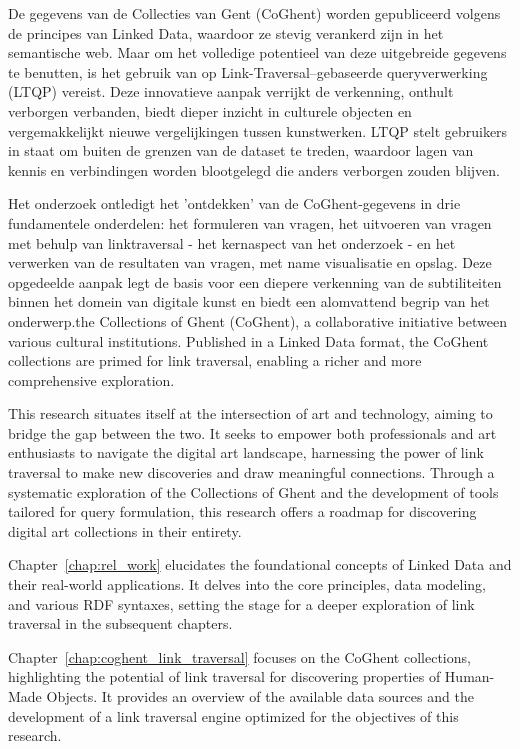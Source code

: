 De gegevens van de Collecties van Gent (CoGhent) worden gepubliceerd volgens de principes van Linked Data, waardoor ze stevig verankerd zijn in het semantische web. Maar om het volledige potentieel van deze uitgebreide gegevens te benutten, is het gebruik van op Link-Traversal–gebaseerde queryverwerking (LTQP) vereist. Deze innovatieve aanpak verrijkt de verkenning, onthult verborgen verbanden, biedt dieper inzicht in culturele objecten en vergemakkelijkt nieuwe vergelijkingen tussen kunstwerken. LTQP stelt gebruikers in staat om buiten de grenzen van de dataset te treden, waardoor lagen van kennis en verbindingen worden blootgelegd die anders verborgen zouden blijven.

Het onderzoek ontledigt het 'ontdekken' van de CoGhent-gegevens in drie fundamentele onderdelen: het formuleren van vragen, het uitvoeren van vragen met behulp van linktraversal - het kernaspect van het onderzoek - en het verwerken van de resultaten van vragen, met name visualisatie en opslag. Deze opgedeelde aanpak legt de basis voor een diepere verkenning van de subtiliteiten binnen het domein van digitale kunst en biedt een alomvattend begrip van het onderwerp.the Collections of Ghent (CoGhent), a collaborative initiative between various cultural institutions. Published in a Linked Data format, the CoGhent collections are primed for link traversal, enabling a richer and more comprehensive exploration.

This research situates itself at the intersection of art and technology, aiming to bridge the gap between the two. It seeks to empower both professionals and art enthusiasts to navigate the digital art landscape, harnessing the power of link traversal to make new discoveries and draw meaningful connections. Through a systematic exploration of the Collections of Ghent and the development of tools tailored for query formulation, this research offers a roadmap for discovering digital art collections in their entirety.

Chapter~\ref{chap:rel_work} elucidates the foundational concepts of Linked Data and their real-world applications. It delves into the core principles, data modeling, and various RDF syntaxes, setting the stage for a deeper exploration of link traversal in the subsequent chapters. 

Chapter~\ref{chap:coghent_link_traversal} focuses on the CoGhent collections, highlighting the potential of link traversal for discovering properties of Human-Made Objects. It provides an overview of the available data sources and the development of a link traversal engine optimized for the objectives of this research.

